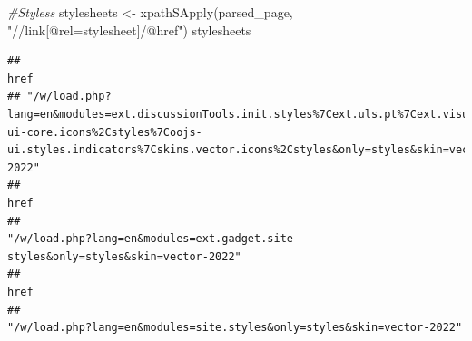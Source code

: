 \documentclass[
]{article}
\newenvironment{Shaded}{\begin{snugshade}}{\end{snugshade}}
\newcommand{\CommentTok}[1]{\textcolor[rgb]{0.56,0.35,0.01}{\textit{#1}}}
\newcommand{\FunctionTok}[1]{\textcolor[rgb]{0.00,0.00,0.00}{#1}}
\newcommand{\NormalTok}[1]{#1}
\newcommand{\OtherTok}[1]{\textcolor[rgb]{0.56,0.35,0.01}{#1}}
\newcommand{\StringTok}[1]{\textcolor[rgb]{0.31,0.60,0.02}{#1}}
\begin{document}
\begin{Shaded}
\begin{Highlighting}[]
\CommentTok{\#Styless}
\NormalTok{stylesheets }\OtherTok{\textless{}{-}} \FunctionTok{xpathSApply}\NormalTok{(parsed\_page, }\StringTok{"//link[@rel=\textquotesingle{}stylesheet\textquotesingle{}]/@href"}\NormalTok{)}
\NormalTok{stylesheets}
\end{Highlighting}
\end{Shaded}

\begin{verbatim}
##                                                                                                                                                                                                                                                                                                                           href 
## "/w/load.php?lang=en&modules=ext.discussionTools.init.styles%7Cext.uls.pt%7Cext.visualEditor.desktopArticleTarget.noscript%7Cext.wikimediaBadges%7Cmediawiki.ui.button%2Cicon%7Cmediawiki.widgets.styles%7Coojs-ui-core.icons%2Cstyles%7Coojs-ui.styles.indicators%7Cskins.vector.icons%2Cstyles&only=styles&skin=vector-2022" 
##                                                                                                                                                                                                                                                                                                                           href 
##                                                                                                                                                                                                                                              "/w/load.php?lang=en&modules=ext.gadget.site-styles&only=styles&skin=vector-2022" 
##                                                                                                                                                                                                                                                                                                                           href 
##                                                                                                                                                                                                                                                         "/w/load.php?lang=en&modules=site.styles&only=styles&skin=vector-2022"
\end{verbatim}
\end{document}
